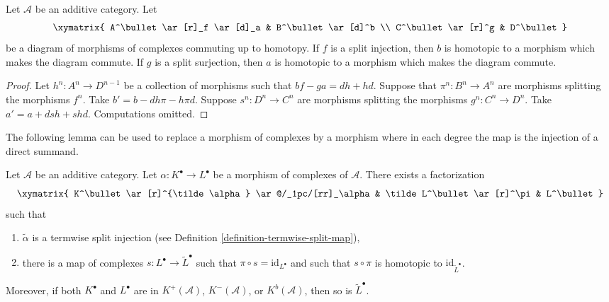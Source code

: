 \begin{lemma}
\label{lemma-make-commute-map}
Let $\mathcal{A}$ be an additive category.
Let
$$
\xymatrix{
A^\bullet \ar[r]_f \ar[d]_a & B^\bullet \ar[d]^b \\
C^\bullet \ar[r]^g & D^\bullet
}
$$
be a diagram of morphisms of complexes commuting up to homotopy.
If $f$ is a split injection, then $b$ is homotopic to a
morphism which makes the diagram commute.
If $g$ is a split surjection, then $a$ is homotopic to a
morphism which makes the diagram commute.
\end{lemma}

\begin{proof}
Let $h^n : A^n \to D^{n - 1}$ be a collection of morphisms
such that $bf - ga = dh + hd$. Suppose that $\pi^n : B^n \to A^n$
are morphisms splitting the morphisms $f^n$.
Take $b' = b - dh\pi - h\pi d$.
Suppose $s^n : D^n \to C^n$ are morphisms splitting the morphisms
$g^n : C^n \to D^n$. Take $a' = a + dsh + shd$.
Computations omitted.
\end{proof}

\noindent
The following lemma can be used to replace a morphism of complexes
by a morphism where in each degree the map is the injection of a
direct summand.

\begin{lemma}
\label{lemma-make-injective}
Let $\mathcal{A}$ be an additive category.
Let $\alpha : K^\bullet \to L^\bullet$ be a morphism
of complexes of $\mathcal{A}$.
There exists a factorization
$$
\xymatrix{
K^\bullet \ar[r]^{\tilde \alpha} \ar@/_1pc/[rr]_\alpha &
\tilde L^\bullet \ar[r]^\pi &
L^\bullet
}
$$
such that
\begin{enumerate}
\item $\tilde \alpha$ is a termwise split injection (see
Definition \ref{definition-termwise-split-map}),
\item there is a map of complexes $s : L^\bullet \to \tilde L^\bullet$
such that $\pi \circ s = \text{id}_{L^\bullet}$ and such that
$s \circ \pi$ is homotopic to $\text{id}_{\tilde L^\bullet}$.
\end{enumerate}
Moreover, if both $K^\bullet$ and $L^\bullet$ are in
$K^{+}(\mathcal{A})$, $K^{-}(\mathcal{A})$, or $K^b(\mathcal{A})$,
then so is $\tilde L^\bullet$.
\end{lemma}

